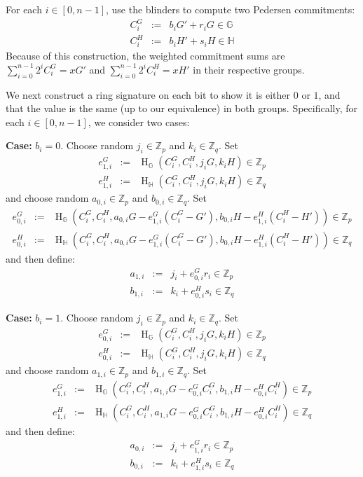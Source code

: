 \documentclass{mrl}
\newcommand{\hg}{\operatorname{H}_\mathbb{G}}
\newcommand{\hh}{\operatorname{H}_\mathbb{H}}
\newcommand{\zp}{\mathbb{Z}_p}
\newcommand{\zq}{\mathbb{Z}_q}
\begin{document}
For each $i \in [0,n-1]$, use the blinders to compute two Pedersen commitments:
\begin{eqnarray*}
C_i^G &:=& b_iG' + r_iG \in \mathbb{G} \\
C_i^H &:=& b_iH' + s_iH \in \mathbb{H}
\end{eqnarray*}
Because of this construction, the weighted commitment sums are $\sum_{i=0}^{n-1} 2^iC_i^G = xG'$ and $\sum_{i=0}^{n-1} 2^iC_i^H = xH'$ in their respective groups.

We next construct a ring signature on each bit to show it is either $0$ or $1$, and that the value is the same (up to our equivalence) in both groups. Specifically, for each $i \in [0,n-1]$, we consider two cases:

\textbf{Case:} $b_i = 0$. Choose random $j_i \in \zp$ and $k_i \in \zq$. Set
\begin{eqnarray*}
e_{1,i}^G &:=& \hg\left( C_i^G, C_i^H, j_iG, k_iH \right) \in \zp \\
e_{1,i}^H &:=& \hh\left( C_i^G, C_i^H, j_iG, k_iH \right) \in \zq
\end{eqnarray*}
and choose random $a_{0,i} \in \zp$ and $b_{0,i} \in \zq$. Set
\begin{eqnarray*}
e_{0,i}^G &:=& \hg\left( C_i^G, C_i^H, a_{0,i}G - e_{1,i}^G(C_i^G-G'), b_{0,i}H - e_{1,i}^H(C_i^H-H') \right) \in \zp \\
e_{0,i}^H &:=& \hh\left( C_i^G, C_i^H, a_{0,i}G - e_{1,i}^G(C_i^G-G'), b_{0,i}H - e_{1,i}^H(C_i^H-H') \right) \in \zq
\end{eqnarray*}
and then define:
\begin{eqnarray*}
a_{1,i} &:=& j_i + e_{0,i}^Gr_i \in \zp \\
b_{1,i} &:=& k_i + e_{0,i}^Hs_i \in \zq
\end{eqnarray*}

\textbf{Case:} $b_i = 1$. Choose random $j_i \in \zp$ and $k_i \in \zq$. Set
\begin{eqnarray*}
e_{0,i}^G &:=& \hg\left( C_i^G, C_i^H, j_iG, k_iH \right) \in \zp \\
e_{0,i}^H &:=& \hh\left( C_i^G, C_i^H, j_iG, k_iH \right) \in \zq
\end{eqnarray*}
and choose random $a_{1,i} \in \zp$ and $b_{1,i} \in \zq$. Set
\begin{eqnarray*}
e_{1,i}^G &:=& \hg\left( C_i^G, C_i^H, a_{1,i}G - e_{0,i}^GC_i^G, b_{1,i}H - e_{0,i}^HC_i^H \right) \in \zp \\
e_{1,i}^H &:=& \hh\left( C_i^G, C_i^H, a_{1,i}G - e_{0,i}^GC_i^G, b_{1,i}H - e_{0,i}^HC_i^H \right) \in \zq
\end{eqnarray*}
and then define:
\begin{eqnarray*}
a_{0,i} &:=& j_i + e_{1,i}^Gr_i \in \zp \\
b_{0,i} &:=& k_i + e_{1,i}^Hs_i \in \zq
\end{eqnarray*}
\end{document}
